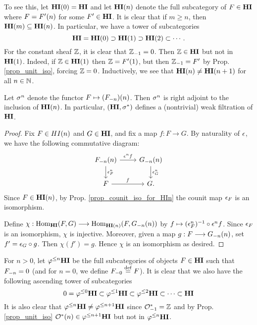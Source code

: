 To see this, let $\LHI[0]{\HI} = \HI$ and let $\LHI[n]{\HI}$ 
denote the full subcategory of $F \in \HI$ where $F = \LHI[n]{F'}$ 
for some $F' \in \HI$. It is clear that if $m \geq n$, then 
$\LHI[m]{\HI} \subseteq \LHI[n]{\HI}$. In particular, we have a 
tower of subcategories
\[
\HI = \LHI[0]{\HI} \supset \LHI[1]{\HI} \supset \LHI[2]{\HI} 
\subset \cdots.
\]
For the constant sheaf $\Z$, it is clear that $\RHI{\Z} = 0$. 
Then $\Z \in \HI$ but not in $\LHI{\HI}$. Indeed, if $\Z \in 
\LHI{\HI}$ then $\Z = \LHI{F'}$, but then $\RHI{\Z} = F'$ by Prop. 
\ref{prop_unit_iso}, forcing $\Z = 0$. Inductively, we see 
that $\LHI[n]{\HI} \neq \LHI[n + 1]{\HI}$ for all $n \in \N$.

\begin{prop}
Let $\sgHI{n}$ denote the functor $F \mapsto 
\LHI[n]{(\RHI[n]{F})}$. Then $\sgHI{n}$ is right adjoint to the 
inclusion of $\LHI[n]{\HI}$. In particular, $(\HI, \sgHI{*})$ 
defines a (nontrivial) weak filtration of $\HI$.
\end{prop}
\begin{proof}
Fix $F \in \LHI[n]{HI}$ and $G \in \HI$, and fix a map $f : 
F \to G$. By naturality of $\cuHI$, we have the following 
commutative diagram:
\[
\begin{tikzcd}
\LHI[n]{\RHI[n]{F}} \arrow{r}{\cuHI^n f}\arrow{d}{\cuHI^n_F} 
& \LHI[n]{\RHI[n]{G}} \arrow{d}{\cuHI^n_G} \\
F \arrow{r}{f}
& G.
\end{tikzcd}
\]
Since $F \in \LHI[n]{\HI}$, by Prop. \ref{prop_counit_iso_for_HIn} 
the counit map $\cuHI_F$ is an isomorphism.

Define $\chi: \homHI(F, G) \to \hom_{\LHI[n]{\HI}}(F, 
\LHI[n]{\RHI[n]{G}})$ by $f \mapsto (\cuHI^n_F)^{-1} \comp \cuHI^n 
f$. Since $\cuHI_F$ is an isomorphism, $\chi$ is injective. 
Moreover, given a map $g: F \to \LHI[n]{\RHI[n]{G}}$, set $f' = 
\cuHI_G \comp g$. Then $\chi(f') = g$. Hence $\chi$ is an 
isomorphism as desired.
\end{proof}

For $n > 0$, let $\tlHI{n}\HI$ be the full subcategories of 
objects $F \in \HI$ such that $\RHI[n]{F} = 0$ (and for $n = 0$, 
we define $\RHI[0]{F} \defeq F$). It is clear that we also have 
the following ascending tower of subcategories
\[
0 = \tlHI{0}\HI \subset \tlHI{1}\HI \subset \tlHI{2}\HI \subset 
   \cdots \subset \HI
\]
It is also clear that $\tlHI{n}\HI \neq \tlHI{n + 1}\HI$ since 
$\RHI{\Ox} = \Z$ and by Prop. \ref{prop_unit_iso} $\LHI[n]{\Ox} 
\in \tlHI{n + 1}\HI$ but not in $\tlHI{n}\HI$.


